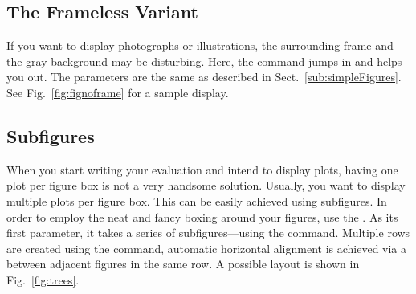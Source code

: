 \subsection{The Frameless Variant}\label{sub:framelessFigures}

If you want to display photographs or illustrations, the surrounding frame and the gray background may be disturbing. Here, the command  jumps in and helps you out. The parameters are the same as described in Sect.~\ref{sub:simpleFigures}. See Fig.~\ref{fig:fignoframe} for a sample display.



\subsection{Subfigures}\label{sub:subfigures}

When you start writing your evaluation and intend to display plots, having one plot per figure box is not a very handsome solution. Usually, you want to display multiple plots per figure box. This can be easily achieved using subfigures. In order to employ the neat and fancy boxing around your figures, use the . As its first parameter, it takes a series of subfigures---using the  command. Multiple rows are created using the \cmd{\textbackslash\!\textbackslash{}} command, automatic horizontal alignment is achieved via a  between adjacent figures in the same row. A possible layout is shown in Fig.~\ref{fig:trees}.



